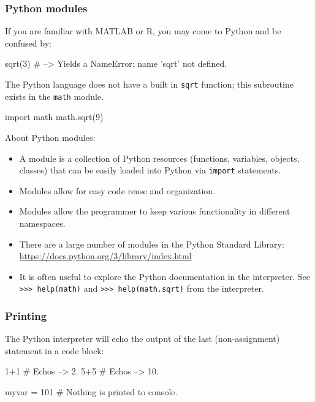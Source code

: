 \documentclass[12pt,letterpaper,twoside]{article}
\begin{document}
\subsubsection{Python modules}
If you are familiar with MATLAB or R, you may come to Python and be confused
by:

\begin{python}
sqrt(3)  # --> Yields a NameError: name 'sqrt' not defined.
\end{python}

The Python language does not have a built in \texttt{sqrt} function;
this subroutine exists in the \texttt{math} module.

\begin{python}
import math
math.sqrt(9)
\end{python}

About Python modules:

\begin{itemize}
\item
  A module is a collection of Python resources (functions, variables,
  objects, classes) that can be easily loaded into Python via
  \texttt{import} statements.
\item
  Modules allow for easy code reuse and organization.
\item
  Modules allow the programmer to keep various functionality in
  different namespaces.
\item
  There are a large number of modules in the Python Standard Library:
  \url{https://docs.python.org/3/library/index.html}
\item
  It is often useful to explore the Python documentation in the
  interpreter. See \newline
  \texttt{>>> help(math)} and
  \texttt{>>> help(math.sqrt)}
  from the interpreter.
\end{itemize}

\subsubsection{Printing}

The Python interpreter 
will echo the output of the last (non-assignment)
statement in a code block:

\begin{python}
1+1  # Echos --> 2.
5+5  # Echos --> 10.
\end{python}

\begin{python}
myvar = 101  # Nothing is printed to console.
\end{python}
\end{document}

